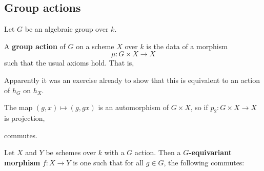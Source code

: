 \documentclass[12pt]{article}
\begin{document}
\subsection{Group actions}
Let $G$ be an algebraic group over $k$. 
\begin{defn}
	A \textbf{group action} of $G$ on a scheme $X$ over $k$ is the data of a morphism
	\[\mu:G\times X\to X\]
	such that the usual axioms hold. That is,
	\begin{center}
	\end{center}
\end{defn}
\begin{rmk}
	Apparently it was an exercise already to show that this is equivalent to an action of $h_G$ on $h_X$.
\end{rmk}
\begin{rmk}
	The map $(g,x)\mapsto(g,gx)$ is an automorphism of $G\times X$, so if $p_2:G\times X\to X$ is projection,
	\begin{center}
	\end{center}
	commutes.
\end{rmk}
\begin{defn}
	Let $X$ and $Y$ be schemes over $k$ with a $G$ action. Then a \textbf{$G$-equivariant morphism} $f:X\to Y$ 
	is one such that for all $g\in G$, the following commutes:
	\begin{center}
	\end{center}
\end{defn}
\end{document}
